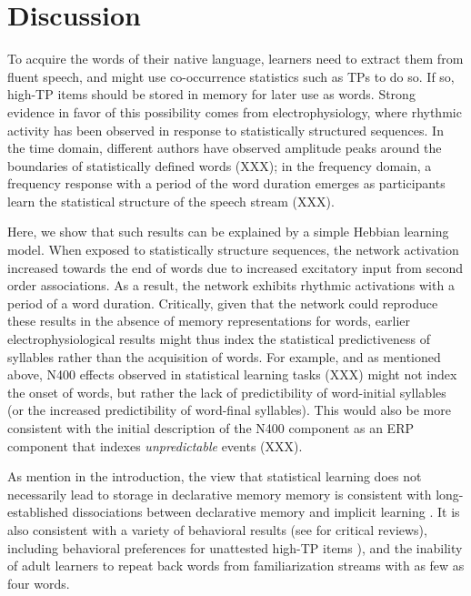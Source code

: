 \documentclass[
]{article}
\begin{document}
\clearpage

\hypertarget{discussion}{%
\section{Discussion}\label{discussion}}

To acquire the words of their native language, learners need to extract
them from fluent speech, and might use co-occurrence statistics such as
TPs to do so. If so, high-TP items should be stored in memory for later
use as words. Strong evidence in favor of this possibility comes from
electrophysiology, where rhythmic activity has been observed in response
to statistically structured sequences. In the time domain, different
authors have observed amplitude peaks around the boundaries of
statistically defined words (XXX); in the frequency domain, a frequency
response with a period of the word duration emerges as participants
learn the statistical structure of the speech stream (XXX).

Here, we show that such results can be explained by a simple Hebbian
learning model. When exposed to statistically structure sequences, the
network activation increased towards the end of words due to increased
excitatory input from second order associations. As a result, the
network exhibits rhythmic activations with a period of a word duration.
Critically, given that the network could reproduce these results in the
absence of memory representations for words, earlier
electrophysiological results might thus index the statistical
predictiveness of syllables rather than the acquisition of words. For
example, and as mentioned above, N400 effects observed in statistical
learning tasks (XXX) might not index the onset of words, but rather the
lack of predictibility of word-initial syllables (or the increased
predictibility of word-final syllables). This would also be more
consistent with the initial description of the N400 component as an ERP
component that indexes \emph{unpredictable} events (XXX).

As mention in the introduction, the view that statistical learning does
not necessarily lead to storage in declarative memory memory is
consistent with long-established dissociations between declarative
memory and implicit learning
\citetext{\citealp{Cohen1980}; \citealp{Finn2016}; \citealp[\citet{Knowlton1996a}]{Graf1984}; \citealp{Poldrack2001}; \citealp{Squire1992}}.
It is also consistent with a variety of behavioral results (see
\citep[\citet{Endress-stat-recall}]{Endress2020} for critical reviews),
including behavioral preferences for unattested high-TP items
\citep{Endress-Action-Axc, Endress-Phantoms-Vision, Endress-Phantoms, Jones2007, Turk-Browne-reversal}),
and the inability of adult learners to repeat back words from
familiarization streams with as few as four
words\citep{Endress-stat-recall}.
\end{document}
